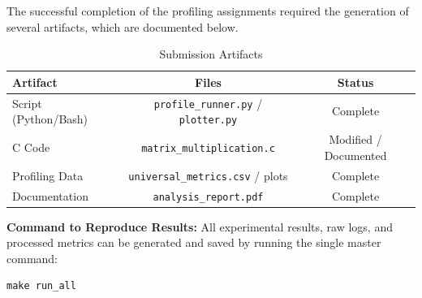 \documentclass[11pt, a4paper]{article}
\begin{document}
The successful completion of the profiling assignments required the generation of several artifacts, which are documented below.
\begin{table}[h]
\centering
\caption{Submission Artifacts}
\label{tab:submission_artifacts}
\begin{tabularx}{\textwidth}{l C C}
\toprule
\textbf{Artifact} & \textbf{Files} & \textbf{Status} \\
\midrule
Script (Python/Bash) & \texttt{profile\_runner.py} / \texttt{plotter.py} & Complete \\
C Code & \texttt{matrix\_multiplication.c} & Modified / Documented \\
Profiling Data & \texttt{universal\_metrics.csv} / plots & Complete \\
Documentation & \texttt{analysis\_report.pdf} & Complete \\
\bottomrule
\end{tabularx}
\end{table}

\noindent\textbf{Command to Reproduce Results:} All experimental results, raw logs, and processed metrics can be generated and saved by running the single master command:

\begin{verbatim}
make run_all
\end{verbatim}
\end{document}
